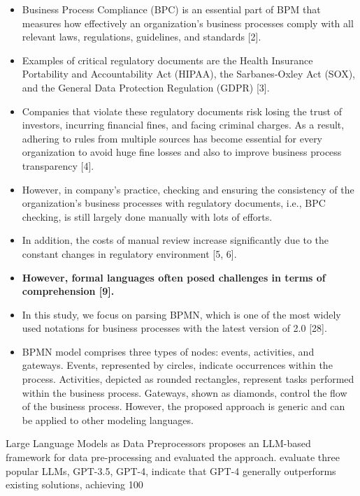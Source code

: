\begin{itemize}
\item Business Process Compliance (BPC) is an essential part of BPM that measures how effectively an organization’s business processes comply with all relevant laws, regulations, guidelines, and standards [2].
\item Examples of critical regulatory documents are the Health Insurance Portability and Accountability Act (HIPAA), the Sarbanes-Oxley Act (SOX), and the General Data Protection Regulation (GDPR) [3]. 
\item Companies that violate these regulatory documents risk losing the trust of investors, incurring financial fines, and facing criminal charges. As a result, adhering to rules from multiple sources has become essential for every organization to avoid huge fine losses and also to improve business process transparency [4].
\item However, in company’s practice, checking and ensuring the consistency of the organization’s business processes with regulatory documents, i.e., BPC checking, is still largely done manually with lots of efforts.
\item In addition, the costs of manual review increase significantly due to the constant changes in regulatory environment [5, 6].
\item \textbf{However, formal languages often posed challenges in terms of comprehension [9].}
\item In this study, we focus on parsing BPMN, which is one of the most widely used notations for business processes with the latest version of 2.0 [28].
\item BPMN model comprises three types of nodes: events, activities, and gateways. Events, represented by circles, indicate occurrences within the process. Activities, depicted as rounded rectangles, represent tasks performed within the business process. Gateways, shown as diamonds, control the flow of the business process. However, the proposed approach is generic and can be applied to other modeling languages.
\end{itemize}


Large Language Models as Data Preprocessors \cite{zhangLargeLanguageModels2023}
 \cite{zhangLargeLanguageModels2023} proposes an LLM-based framework for data pre-processing and evaluated the approach.
evaluate three popular LLMs, GPT-3.5, GPT-4,
indicate that GPT-4 generally outperforms existing solutions, achieving 100%

